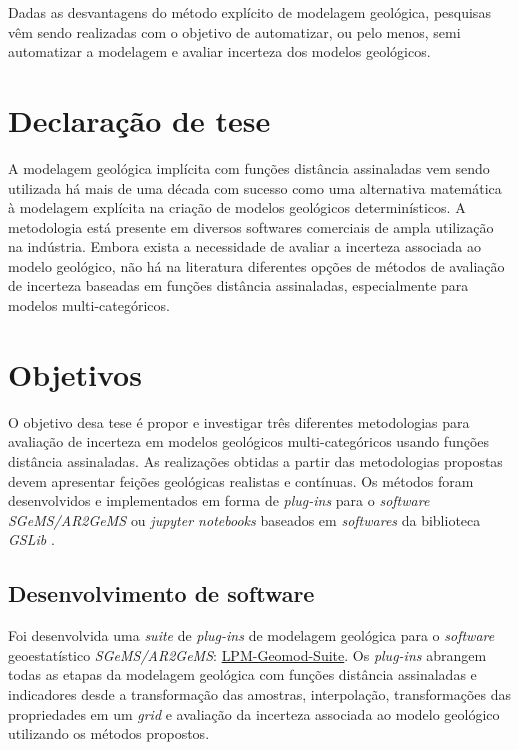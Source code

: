 Dadas as desvantagens do método explícito de modelagem geológica, pesquisas vêm sendo realizadas com o objetivo de automatizar, ou pelo menos, semi automatizar a modelagem e avaliar incerteza dos modelos geológicos.

\section{Declaração de tese}

\begin{tcolorbox}
A modelagem geológica implícita com funções distância assinaladas vem sendo utilizada há mais de uma década com sucesso como uma alternativa matemática à modelagem explícita na criação de modelos geológicos determinísticos. A metodologia está presente em diversos softwares comerciais de ampla utilização na indústria. Embora exista a necessidade de avaliar a incerteza associada ao modelo geológico, não há na literatura diferentes opções de métodos de avaliação de incerteza baseadas em funções distância assinaladas, especialmente para modelos multi-categóricos.
\end{tcolorbox}

\section{Objetivos}

O objetivo desa tese é propor e investigar três diferentes metodologias para avaliação de incerteza em modelos geológicos   multi-categóricos usando funções distância assinaladas. As realizações obtidas a partir das metodologias propostas devem apresentar feições geológicas realistas e contínuas. Os métodos foram desenvolvidos e implementados em forma de \textit{plug-ins} para o \textit{software SGeMS/AR2GeMS} \cite{remy2009applied} ou \textit{jupyter notebooks} baseados em \textit{softwares} da biblioteca \textit{GSLib} \cite{deutsch1992geostatistical}.

\subsection{Desenvolvimento de software}

Foi desenvolvida uma \textit{suite} de \textit{plug-ins} de modelagem geológica para o \textit{software} geoestatístico \textit{SGeMS/AR2GeMS}: \href{https://github.com/robertorolo/LPM-Geomod_Suite}{LPM-Geomod-Suite}. Os \textit{plug-ins} abrangem todas as etapas da modelagem geológica com funções distância assinaladas e indicadores desde a transformação das amostras, interpolação, transformações das propriedades em um \textit{grid} e avaliação da incerteza associada ao modelo geológico utilizando os métodos propostos. 

